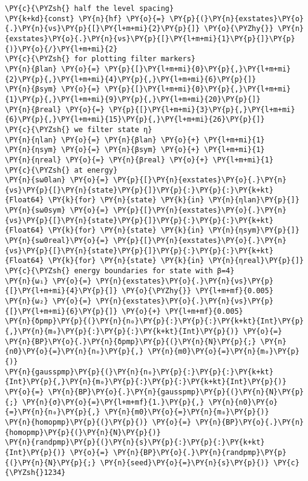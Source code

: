 \begin{Verbatim}[commandchars=\\\{\}]
\PY{c}{\PYZsh{} half the level spacing}
\PY{k+kd}{const} \PY{n}{hf} \PY{o}{=} \PY{p}{(}\PY{n}{exstates}\PY{o}{.}\PY{n}{νs}\PY{p}{[}\PY{l+m+mi}{2}\PY{p}{]} \PY{o}{\PYZhy{}} \PY{n}{exstates}\PY{o}{.}\PY{n}{νs}\PY{p}{[}\PY{l+m+mi}{1}\PY{p}{]}\PY{p}{)}\PY{o}{/}\PY{l+m+mi}{2}
\PY{c}{\PYZsh{} for plotting filter markers}
\PY{n}{βlan} \PY{o}{=} \PY{p}{[}\PY{l+m+mi}{0}\PY{p}{,}\PY{l+m+mi}{2}\PY{p}{,}\PY{l+m+mi}{4}\PY{p}{,}\PY{l+m+mi}{6}\PY{p}{]}
\PY{n}{βsym} \PY{o}{=} \PY{p}{[}\PY{l+m+mi}{0}\PY{p}{,}\PY{l+m+mi}{1}\PY{p}{,}\PY{l+m+mi}{9}\PY{p}{,}\PY{l+m+mi}{20}\PY{p}{]}
\PY{n}{βreal} \PY{o}{=} \PY{p}{[}\PY{l+m+mi}{3}\PY{p}{,}\PY{l+m+mi}{6}\PY{p}{,}\PY{l+m+mi}{15}\PY{p}{,}\PY{l+m+mi}{26}\PY{p}{]}
\PY{c}{\PYZsh{} we filter state η}
\PY{n}{ηlan} \PY{o}{=} \PY{n}{βlan} \PY{o}{+} \PY{l+m+mi}{1}
\PY{n}{ηsym} \PY{o}{=} \PY{n}{βsym} \PY{o}{+} \PY{l+m+mi}{1}
\PY{n}{ηreal} \PY{o}{=} \PY{n}{βreal} \PY{o}{+} \PY{l+m+mi}{1}
\PY{c}{\PYZsh{} at energy}
\PY{n}{sω0lan} \PY{o}{=} \PY{p}{[}\PY{n}{exstates}\PY{o}{.}\PY{n}{νs}\PY{p}{[}\PY{n}{state}\PY{p}{]}\PY{p}{:}\PY{p}{:}\PY{k+kt}{Float64} \PY{k}{for} \PY{n}{state} \PY{k}{in} \PY{n}{ηlan}\PY{p}{]}
\PY{n}{sω0sym} \PY{o}{=} \PY{p}{[}\PY{n}{exstates}\PY{o}{.}\PY{n}{νs}\PY{p}{[}\PY{n}{state}\PY{p}{]}\PY{p}{:}\PY{p}{:}\PY{k+kt}{Float64} \PY{k}{for} \PY{n}{state} \PY{k}{in} \PY{n}{ηsym}\PY{p}{]}
\PY{n}{sω0real}\PY{o}{=} \PY{p}{[}\PY{n}{exstates}\PY{o}{.}\PY{n}{νs}\PY{p}{[}\PY{n}{state}\PY{p}{]}\PY{p}{:}\PY{p}{:}\PY{k+kt}{Float64} \PY{k}{for} \PY{n}{state} \PY{k}{in} \PY{n}{ηreal}\PY{p}{]}
\PY{c}{\PYZsh{} energy boundaries for state with β=4}
\PY{n}{ω₁} \PY{o}{=} \PY{n}{exstates}\PY{o}{.}\PY{n}{νs}\PY{p}{[}\PY{l+m+mi}{4}\PY{p}{]} \PY{o}{\PYZhy{}} \PY{l+m+mf}{0.005}
\PY{n}{ω₂} \PY{o}{=} \PY{n}{exstates}\PY{o}{.}\PY{n}{νs}\PY{p}{[}\PY{l+m+mi}{6}\PY{p}{]} \PY{o}{+} \PY{l+m+mf}{0.005}
\PY{n}{δpmp}\PY{p}{(}\PY{n}{n₀}\PY{p}{:}\PY{p}{:}\PY{k+kt}{Int}\PY{p}{,}\PY{n}{m₀}\PY{p}{:}\PY{p}{:}\PY{k+kt}{Int}\PY{p}{)} \PY{o}{=} \PY{n}{BP}\PY{o}{.}\PY{n}{δpmp}\PY{p}{(}\PY{n}{N}\PY{p}{;} \PY{n}{n0}\PY{o}{=}\PY{n}{n₀}\PY{p}{,} \PY{n}{m0}\PY{o}{=}\PY{n}{m₀}\PY{p}{)}
\PY{n}{gausspmp}\PY{p}{(}\PY{n}{n₀}\PY{p}{:}\PY{p}{:}\PY{k+kt}{Int}\PY{p}{,}\PY{n}{m₀}\PY{p}{:}\PY{p}{:}\PY{k+kt}{Int}\PY{p}{)} \PY{o}{=} \PY{n}{BP}\PY{o}{.}\PY{n}{gausspmp}\PY{p}{(}\PY{n}{N}\PY{p}{;} \PY{n}{σ}\PY{o}{=}\PY{l+m+mf}{1.}\PY{p}{,} \PY{n}{n0}\PY{o}{=}\PY{n}{n₀}\PY{p}{,} \PY{n}{m0}\PY{o}{=}\PY{n}{m₀}\PY{p}{)}
\PY{n}{homopmp}\PY{p}{(}\PY{p}{)} \PY{o}{=} \PY{n}{BP}\PY{o}{.}\PY{n}{homopmp}\PY{p}{(}\PY{n}{N}\PY{p}{)}
\PY{n}{randpmp}\PY{p}{(}\PY{n}{s}\PY{p}{:}\PY{p}{:}\PY{k+kt}{Int}\PY{p}{)} \PY{o}{=} \PY{n}{BP}\PY{o}{.}\PY{n}{randpmp}\PY{p}{(}\PY{n}{N}\PY{p}{;} \PY{n}{seed}\PY{o}{=}\PY{n}{s}\PY{p}{)} \PY{c}{\PYZsh{}1234}

\end{Verbatim}
